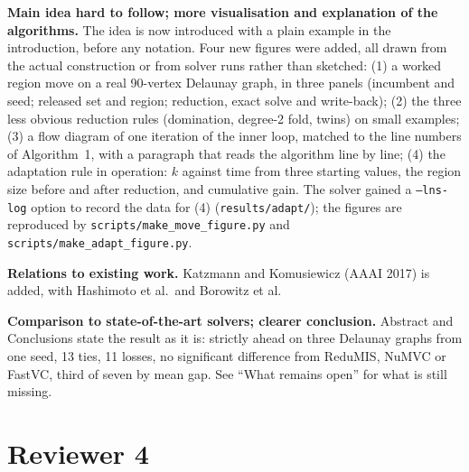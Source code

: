 \documentclass[11pt]{article}
\newcommand{\rev}[1]{\medskip\noindent\textbf{#1}}
\begin{document}
\rev{Main idea hard to follow; more visualisation and explanation of the algorithms.}
The idea is now introduced with a plain example in the introduction, before any
notation. Four new figures were added, all drawn from the actual construction or
from solver runs rather than sketched: (1) a worked region move on a real
90-vertex Delaunay graph, in three panels (incumbent and seed; released set and
region; reduction, exact solve and write-back); (2) the three less obvious
reduction rules (domination, degree-2 fold, twins) on small examples; (3) a
flow diagram of one iteration of the inner loop, matched to the line numbers of
Algorithm~1, with a paragraph that reads the algorithm line by line; (4) the
adaptation rule in operation: $k$ against time from three starting values, the
region size before and after reduction, and cumulative gain. The solver gained a
\texttt{--lns-log} option to record the data for (4)
(\texttt{results/adapt/}); the figures are reproduced by
\texttt{scripts/make\_move\_figure.py} and \texttt{scripts/make\_adapt\_figure.py}.

\rev{Relations to existing work.}
Katzmann and Komusiewicz (AAAI 2017) is added, with Hashimoto et al.\ and
Borowitz et al.

\rev{Comparison to state-of-the-art solvers; clearer conclusion.}
Abstract and Conclusions state the result as it is: strictly ahead on three
Delaunay graphs from one seed, 13 ties, 11 losses, no significant difference from
ReduMIS, NuMVC or FastVC, third of seven by mean gap. See ``What remains open''
for what is still missing.

\section*{Reviewer 4}
\end{document}
